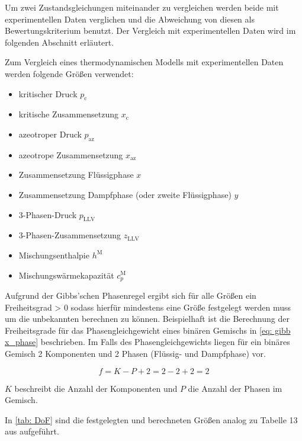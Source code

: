 \documentclass[../thesis.tex]{subfiles}
\begin{document}
Um zwei Zustandsgleichungen miteinander zu vergleichen werden beide mit experimentellen Daten verglichen und die Abweichung von diesen als Bewertungskriterium benutzt. Der Vergleich mit experimentellen Daten wird im folgenden Abschnitt erläutert.

Zum Vergleich eines thermodynamischen Modells mit experimentellen Daten werden folgende Größen verwendet:
\begin{itemize}
	\item kritischer Druck $ p_\mathrm{c} $
	\item kritische Zusammensetzung $ x_\mathrm{c} $
	\item azeotroper Druck $ p_\mathrm{az} $
	\item azeotrope Zusammensetzung $ x_\mathrm{az} $
	\item Zusammensetzung Flüssigphase $ x $
	\item Zusammensetzung Dampfphase (oder zweite Flüssigphase) $ y $
	\item 3-Phasen-Druck $p_{\mathrm{LLV}}$
	\item 3-Phasen-Zusammensetzung $z_{\mathrm{LLV}}$
	\item Mischungsenthalpie $h^{\mathrm{M}}$
	\item Mischungswärmekapazität $c_p^{\mathrm{M}}$
\end{itemize}

Aufgrund der Gibbs'schen Phasenregel ergibt sich für alle Größen ein Freiheitsgrad > 0 sodass hierfür mindestens eine Größe festgelegt werden muss um die unbekannten berechnen zu können. Beispielhaft ist die Berechnung der Freiheitsgrade für das Phasengleichgewicht eines binären Gemischs in \autoref{eq: gibb x_phase} beschrieben. Im Falls des Phasengleichgewichts liegen für ein binäres Gemisch 2 Komponenten und 2 Phasen (Flüssig- und Dampfphase) vor.

\begin{equation}
	\label{eq: gibb x_phase}
	f = K - P + 2 = 2 - 2 + 2 = 2
\end{equation}

$ K $ beschreibt die Anzahl der Komponenten und $ P $ die Anzahl der Phasen im Gemisch.

In \autoref{tab: DoF} sind die festgelegten und berechneten Größen analog zu Tabelle 13 aus \cite{jaubert2020benchmark} aufgeführt.
\end{document}
